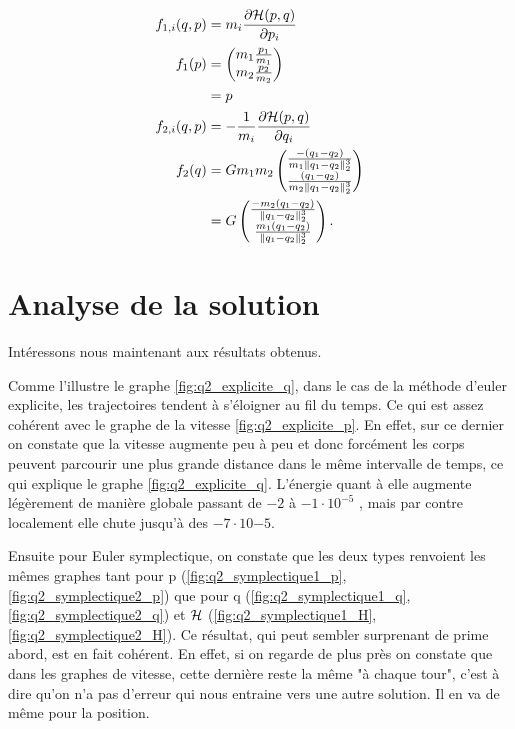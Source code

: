 \begin{align*}
 f_{1,i}(q,p) &= m_i \fpart{\Ha(p,q)}{p_i} \\	
  f_1(p) & =
  \begin{pmatrix}
    m_1\frac{p_1}{m_1}\\
    m_2\frac{p_2}{m_2}
  \end{pmatrix}\\
  & = p\\
%	
 f_{2,i}(q,p) &= -\frac{1}{m_i}\fpart{\Ha(p,q)}{q_i} \\
  f_2(q) & = Gm_1m_2
  \begin{pmatrix}
    \frac{-(q_1-q_2)}{m_1\|q_1-q_2\|_2^3}\\
    \frac{(q_1-q_2)}{m_2\|q_1-q_2\|_2^3}
  \end{pmatrix}\\
  & = G
  \begin{pmatrix}
    \frac{-m_2 (q_1-q_2)}{\|q_1-q_2\|_2^3}\\
    \frac{m_1 (q_1-q_2)}{\|q_1-q_2\|_2^3}
  \end{pmatrix}.
\end{align*}


\section{Analyse de la solution}

Intéressons nous maintenant aux résultats obtenus. 

	Comme l'illustre le graphe \ref{fig:q2_explicite_q}, dans le cas de la méthode d'euler explicite, les trajectoires tendent à s'éloigner au fil du temps. Ce qui est assez cohérent avec le graphe de la vitesse \ref{fig:q2_explicite_p}. En effet, sur ce dernier on constate que la vitesse augmente peu à peu et donc forcément les corps peuvent parcourir une plus grande distance dans le même intervalle de temps, ce qui explique le graphe \ref{fig:q2_explicite_q}. L'énergie quant à elle augmente légèrement de manière globale  passant de $-2$ à $-1 \cdot 10^{-5}$ , mais par contre localement elle chute jusqu'à des $-7 \cdot 10{-5}$. 
	
	Ensuite pour Euler symplectique, on constate que les deux types renvoient les mêmes graphes tant pour p (\ref{fig:q2_symplectique1_p}, \ref{fig:q2_symplectique2_p}) que pour q (\ref{fig:q2_symplectique1_q}, \ref{fig:q2_symplectique2_q})  et $\mathcal{H}$ (\ref{fig:q2_symplectique1_H}, \ref{fig:q2_symplectique2_H}). Ce résultat, qui peut sembler surprenant de prime abord, est en fait cohérent. En effet, si on regarde de plus près on constate que dans les graphes de vitesse, cette dernière reste la même "à chaque tour", c'est à dire qu'on n'a pas d'erreur qui nous entraine vers une autre solution. Il en va de même pour la position.   



